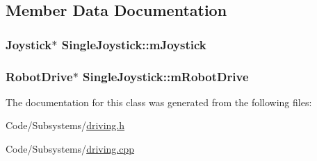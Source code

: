 \subsection{\-Member \-Data \-Documentation}
\hypertarget{class_single_joystick_a7b8dbf586692ef24b5cc76c290fb9486}{
\subsubsection[{m\-Joystick}]{\setlength{\rightskip}{0pt plus 5cm}\-Joystick$\ast$ {\bf \-Single\-Joystick\-::m\-Joystick}}}\label{class_single_joystick_a7b8dbf586692ef24b5cc76c290fb9486}
\hypertarget{class_single_joystick_a236ffa6c31b7e2daf0dfc04378561464}{
\subsubsection[{m\-Robot\-Drive}]{\setlength{\rightskip}{0pt plus 5cm}\-Robot\-Drive$\ast$ {\bf \-Single\-Joystick\-::m\-Robot\-Drive}}}\label{class_single_joystick_a236ffa6c31b7e2daf0dfc04378561464}


\-The documentation for this class was generated from the following files\-:\begin{DoxyCompactItemize}
\item 
\-Code/\-Subsystems/\hyperlink{driving_8h}{driving.\-h}\item 
\-Code/\-Subsystems/\hyperlink{driving_8cpp}{driving.\-cpp}\end{DoxyCompactItemize}
